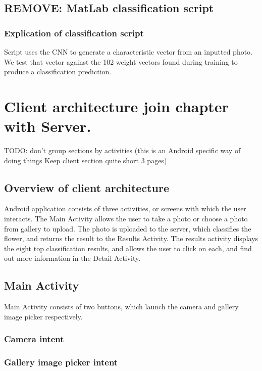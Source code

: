 \documentclass[11pt, a4paper]{report}
\begin{document}
\section{REMOVE: MatLab classification script}

\subsection{Explication of classification script}
Script uses the CNN to generate a characteristic vector from an inputted photo. We test that vector against the 102 weight vectors found during training to produce a classification prediction.





\chapter{Client architecture join chapter with Server. }

TODO: don't group sections by activities (this is an Android specific way of doing things Keep client section quite short 3 pages)


\section{Overview of client architecture}
Android application consists of three activities, or screens with which the user interacts. The Main Activity allows the user to take a photo or choose a photo from gallery to upload. The photo is uploaded to the server, which classifies the flower, and returns the result to the Results Activity. The results activity displays the eight top classification results, and allows the user to click on each, and find out more information in the Detail Activity. 

\section{Main Activity}

Main Activity consists of two buttons, which launch the camera and gallery image picker respectively.

\subsection{Camera intent}

\subsection{Gallery image picker intent}
\end{document}
